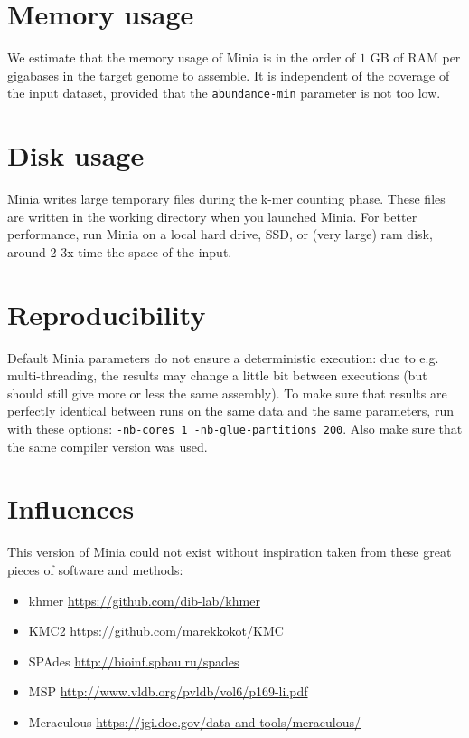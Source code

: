 \documentclass[a4paper]{article}
\begin{document}
\section{Memory usage}

We estimate that the memory usage of Minia is in the order of $1$ GB of RAM per gigabases in the target genome to assemble. It is independent of the coverage of the input dataset, provided that the \verb!abundance-min! parameter is not too low.

\section{Disk usage}

Minia writes large temporary files during the k-mer counting phase. These files are written in the working directory when you launched Minia. For better performance, run Minia on a local hard drive, SSD, or (very large) ram disk, around 2-3x time the space of the input.

\section{Reproducibility}

Default Minia parameters do not ensure a deterministic execution: due to e.g. multi-threading, the results may change a little bit between executions (but should still give more or less the same assembly).
To make sure that results are perfectly identical between runs on the same data and the same parameters, run with these options:
\verb!-nb-cores 1 -nb-glue-partitions 200!. Also make sure that the same compiler version was used.

\section{Influences}

This version of Minia could not exist without inspiration taken from these great pieces of software and methods:
\begin{itemize}
    \item khmer \url{https://github.com/dib-lab/khmer}
    \item KMC2 \url{https://github.com/marekkokot/KMC}
    \item SPAdes \url{http://bioinf.spbau.ru/spades}
    \item MSP \url{http://www.vldb.org/pvldb/vol6/p169-li.pdf}
    \item Meraculous \url{https://jgi.doe.gov/data-and-tools/meraculous/}
\end{itemize}
\end{document}
